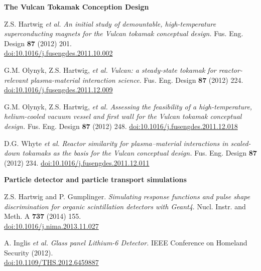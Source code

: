 \documentclass[10pt]{article}
\begin{document}
\vspace{0.5cm}

\textbf{The Vulcan Tokamak Conception Design}
\begin{innerlist}
\item Z.S. Hartwig \textit{et al.} \textit{An initial study of
  demountable, high-temperature superconducting magnets for the Vulcan
  tokamak conceptual design.} Fus. Eng. Design \textbf{87} (2012) 201.
  \\\href{http://dx.doi.org/10.1016/j.fusengdes.2011.10.002}{doi:10.1016/j.fusengdes.2011.10.002}
  \vspace{0.2cm}

\item G.M. Olynyk, Z.S. Hartwig, \textit{et al.} \textit{Vulcan: a
  steady-state tokamak for reactor-relevant plasma-material
  interaction science.} Fus. Eng. Design \textbf{87} (2012) 224.
  \href{http://dx.doi.org/10.1016/j.fusengdes.2011.12.009}{doi:10.1016/j.fusengdes.2011.12.009}
  \vspace{0.2cm}

\item G.M. Olynyk, Z.S. Hartwig, \textit{et al.} \textit{Assessing the
  feasibility of a high-temperature, helium-cooled vacuum vessel and
  first wall for the Vulcan tokamak conceptual design.} Fus. Eng. Design \textbf{87} (2012) 248.
  \href{http://dx.doi.org/10.1016/j.fusengdes.2011.12.018}{doi:10.1016/j.fusengdes.2011.12.018}
  \vspace{0.2cm}

\item D.G. Whyte \textit{et al.} \textit{Reactor similarity for
  plasma--material interactions in scaled-down tokamaks as the basis
  for the Vulcan conceptual design.} Fus. Eng. Design \textbf{87} (2012) 234.
  \href{http://dx.doi.org/10.1016/j.fusengdes.2011.12.011}{doi:10.1016/j.fusengdes.2011.12.011}
\end{innerlist}

\vspace{0.5cm}

\textbf{Particle detector and particle transport simulations}
\begin{innerlist}
\item Z.S. Hartwig and P. Gumplinger. \textit{Simulating response functions
  and pulse shape discrimination for organic scintillation detectors
  with Geant4}. Nucl. Instr. and Meth. A \textbf{737} (2014) 155.\\
  \href{http://dx.doi.org/10.1016/j.nima.2013.11.027}{doi:10.1016/j.nima.2013.11.027}
  \vspace{0.2cm}

\item A. Inglis \textit{et al.} \textit{Glass panel Lithium-6 Detector.}
IEEE Conference on Homeland Security (2012).\\
\href{http://dx.doi.org/10.1109/THS.2012.6459887}{doi:10.1109/THS.2012.6459887}
\end{innerlist}
\end{document}
